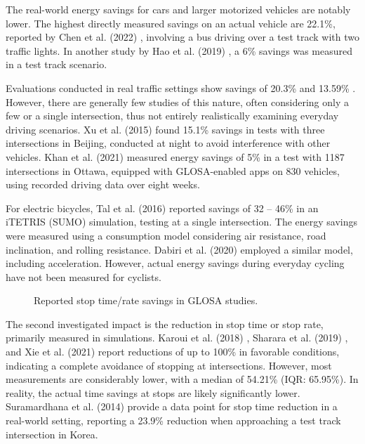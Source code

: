The real-world energy savings for cars and larger motorized vehicles are notably lower. The highest directly measured savings on an actual vehicle are 22.1\%, reported by Chen et al. (2022) \cite{chen_developing_2022}, involving a bus driving over a test track with two traffic lights. In another study by Hao et al. (2019) \cite{hao_eco-approach_2019}, a 6\% savings was measured in a test track scenario.

Evaluations conducted in real traffic settings show savings of 20.3\% \cite{koukoumidis_signalguru_2011} and 13.59\% \cite{xia_field_2012}. However, there are generally few studies of this nature, often considering only a few or a single intersection, thus not entirely realistically examining everyday driving scenarios. Xu et al. (2015) \cite{xu_bb_2015} found 15.1\% savings in tests with three intersections in Beijing, conducted at night to avoid interference with other vehicles. Khan et al. (2021) \cite{khan_eco-drive_2021} measured energy savings of 5\% in a test with 1187 intersections in Ottawa, equipped with GLOSA-enabled apps on 830 vehicles, using recorded driving data over eight weeks.

For electric bicycles, Tal et al. (2016) \cite{tal_vehicular-communications-based_2016} reported savings of 32 -- 46\% in an iTETRIS (SUMO) simulation, testing at a single intersection. The energy savings were measured using a consumption model considering air resistance, road inclination, and rolling resistance. Dabiri et al. (2020) \cite{dabiri_optimized_2020} employed a similar model, including acceleration. However, actual energy savings during everyday cycling have not been measured for cyclists.

\begin{figure}
\centering
\resizebox{\linewidth}{!}{%

}
\caption{Reported stop time/rate savings in GLOSA studies.}
\label{fig:related-work-stops}
\end{figure}

The second investigated impact is the reduction in stop time or stop rate, primarily measured in simulations. Karoui et al. (2018) \cite{karoui_efficiency_2018}, Sharara et al. (2019) \cite{sharara_impact_2019}, and Xie et al. (2021) \cite{xie_dynamic_2021} report reductions of up to 100\% in favorable conditions, indicating a complete avoidance of stopping at intersections. However, most measurements are considerably lower, with a median of 54.21\% (IQR: 65.95\%). In reality, the actual time savings at stops are likely significantly lower. Suramardhana et al. (2014) \cite{suramardhana_driver-centric_2014} provide a data point for stop time reduction in a real-world setting, reporting a 23.9\% reduction when approaching a test track intersection in Korea.

